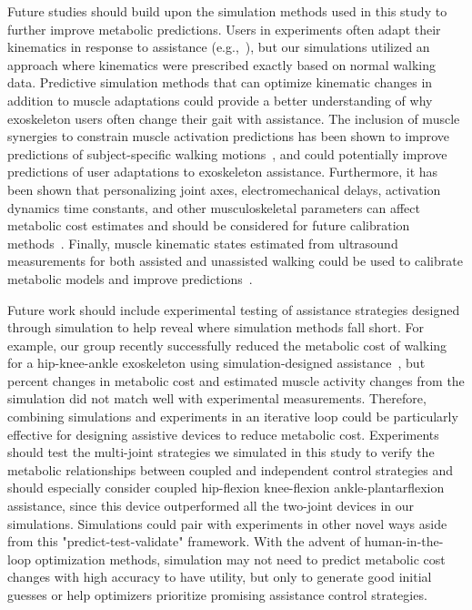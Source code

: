 \documentclass[10pt,letterpaper]{article}
\begin{document}
Future studies should build upon the simulation methods used in this study to further improve metabolic predictions. Users in experiments often adapt their kinematics in response to assistance (e.g.,~\cite{Gordon:2018, Collins:2015, Quinlivan:2017, Panizzolo:2016, Jackson:2015, Galle:2017, Koller:2015}), but our simulations utilized an approach where kinematics were prescribed exactly based on normal walking data. Predictive simulation methods that can optimize kinematic changes in addition to muscle adaptations could provide a better understanding of why exoskeleton users often change their gait with assistance. The inclusion of muscle synergies to constrain muscle activation predictions has been shown to improve predictions of subject-specific walking motions~\cite{Meyer:2016}, and could potentially improve predictions of user adaptations to exoskeleton assistance. Furthermore, it has been shown that personalizing joint axes, electromechanical delays, activation dynamics time constants, and other musculoskeletal  parameters can affect metabolic cost estimates and should be considered for future calibration methods~\cite{Arones:2020}. Finally, muscle kinematic states estimated from ultrasound measurements for both assisted and unassisted walking could be used to calibrate metabolic models and improve predictions~\cite{Nuckols:2020}.

Future work should include experimental testing of assistance strategies designed through simulation to help reveal where simulation methods fall short. For example, our group recently successfully reduced the metabolic cost of walking for a hip-knee-ankle exoskeleton using simulation-designed assistance~\cite{Franks:2020}, but percent changes in metabolic cost and estimated muscle activity changes from the simulation did not match well with experimental measurements. Therefore, combining simulations and experiments in an iterative loop could be particularly effective for designing assistive devices to reduce metabolic cost. Experiments should test the multi-joint strategies we simulated in this study to verify the metabolic relationships between coupled and independent control strategies and should especially consider coupled hip-flexion knee-flexion ankle-plantarflexion assistance, since this device outperformed all the two-joint devices in our simulations. Simulations could pair with experiments in other novel ways aside from this "predict-test-validate" framework. With the advent of human-in-the-loop optimization methods, simulation may not need to predict metabolic cost changes with high accuracy to have utility, but only to generate good initial guesses or help optimizers prioritize promising assistance control strategies.
\end{document}
